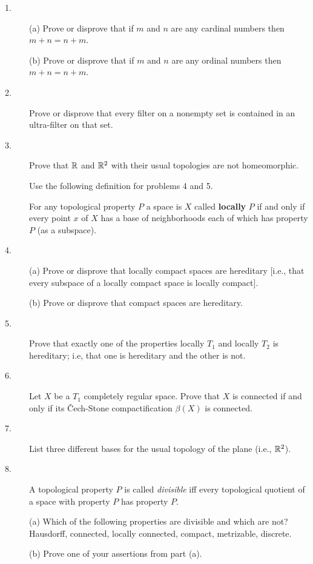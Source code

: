 \documentclass{article}
\begin{document}
\begin{description}
\item[1.] (a)
Prove or disprove that if $m$ and $n$ are any cardinal numbers then
$m+n= n+m$.

\item[\quad] (b)
Prove or disprove that if $m$ and $n$ are any ordinal numbers then
$m+n = n+m$.

\item[2.]
Prove or disprove that every filter on a nonempty set is contained in an
ultra-filter on that set.

\item[3.]
Prove that $\Bbb R$ and $\Bbb R^2$ with their usual topologies are not homeomorphic.

Use the following definition for problems 4 and 5.

For any topological property $P$ a space is $X$ called {\bf locally} $P$
if and only if every point $x$ of $X$ has a base of neighborhoods each of
which has property $P$ (as a subspace).

\item[4.] (a)
Prove or disprove that locally compact spaces are hereditary [i.e., that
every subspace of a locally compact space is locally compact].

\item[\quad] (b)
Prove or disprove that compact spaces are hereditary.

\item[5.]
Prove that exactly one of the properties locally $T_1$ and locally $T_2$ is
hereditary; i.e, that one is hereditary and the other is not.

\item[6.]
Let $X$ be a $T_1$ completely regular space. Prove that $X$ is connected if
and only if its \v Cech-Stone compactification $\beta(X)$ is connected.

\item[7.]
List three different bases for the usual topology of the plane (i.e., $\Bbb R^2$).

\item[8.]
A topological property $P$ is called {\it divisible} iff every topological
quotient of a space with property $P$ has property $P$.

\item[\quad] (a)
Which of the following properties are divisible and which are not? Hausdorff,
connected, locally connected, compact, metrizable, discrete.

\item[\quad] (b)
Prove one of your assertions from part (a).


\end{description}
\end{document}
